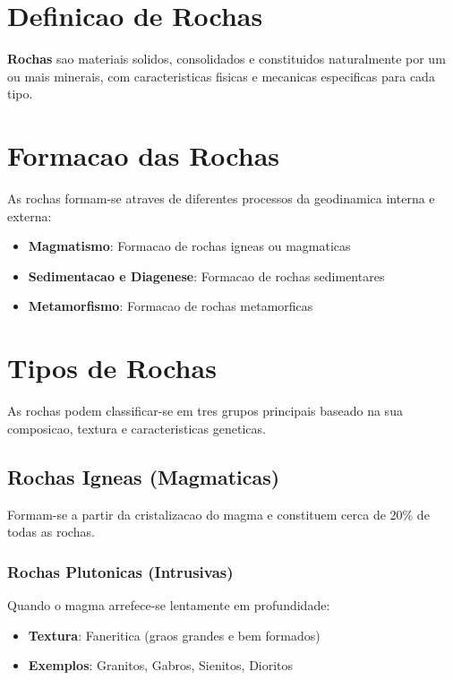 \documentclass[12pt,a4paper,twoside]{book}
\begin{document}
\section{Definicao de Rochas}

\textbf{Rochas} sao materiais solidos, consolidados e constituidos naturalmente por um ou mais 
minerais, com caracteristicas fisicas e mecanicas especificas para cada tipo.

\section{Formacao das Rochas}

As rochas formam-se atraves de diferentes processos da geodinamica interna e externa:
\begin{itemize}
    \item \textbf{Magmatismo}: Formacao de rochas igneas ou magmaticas
    \item \textbf{Sedimentacao e Diagenese}: Formacao de rochas sedimentares
    \item \textbf{Metamorfismo}: Formacao de rochas metamorficas
\end{itemize}

\section{Tipos de Rochas}

As rochas podem classificar-se em tres grupos principais baseado na sua composicao, textura e 
caracteristicas geneticas.

\subsection{Rochas Igneas (Magmaticas)}

Formam-se a partir da cristalizacao do magma e constituem cerca de 20\% de todas as rochas.

\subsubsection{Rochas Plutonicas (Intrusivas)}

Quando o magma arrefece-se lentamente em profundidade:
\begin{itemize}
    \item \textbf{Textura}: Faneritica (graos grandes e bem formados)
    \item \textbf{Exemplos}: Granitos, Gabros, Sienitos, Dioritos
\end{itemize}
\end{document}
